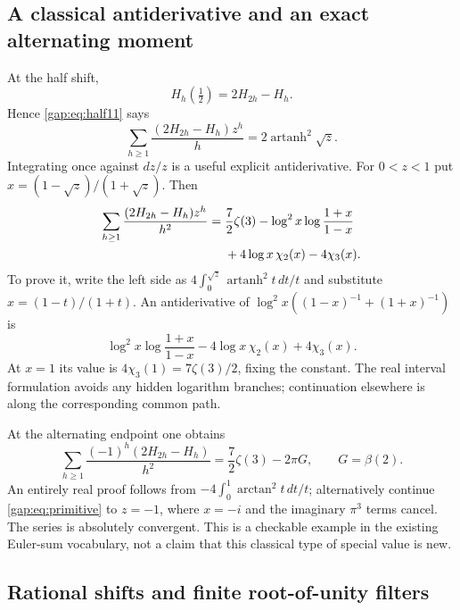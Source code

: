 \documentclass[11pt,letterpaper]{article}
\numberwithin{equation}{section}
\theoremstyle{plain}
\theoremstyle{definition}
\theoremstyle{remark}
\begin{document}
\subsection{A classical antiderivative and an exact alternating moment}

At the half shift,
\[
 H_h(\tfrac12)=2H_{2h}-H_h.
\]
Hence \eqref{gap:eq:half11} says
\begin{equation}\label{gap:eq:harmonic-half}
 \sum_{h\geq1}\frac{(2H_{2h}-H_h)z^h}{h}
     =2\operatorname{artanh}^2\sqrt z.
\end{equation}
Integrating once against $dz/z$ is a useful explicit antiderivative.
For $0<z<1$ put \mbox{$x=(1-\sqrt z)/(1+\sqrt z)$}. Then
\begin{align}
 \sum_{h\geq1}\frac{(2H_{2h}-H_h)z^h}{h^2}
 ={}&\frac72\zeta(3)
   -\log^2x\log\frac{1+x}{1-x}\notag\\
   &+4\log x\,\chi_2(x)-4\chi_3(x).
 \label{gap:eq:primitive}
\end{align}
To prove it, write the left side as
$4\int_0^{\sqrt z}\operatorname{artanh}^2t\,dt/t$ and substitute
$x=(1-t)/(1+t)$. An antiderivative of
$\log^2x((1-x)^{-1}+(1+x)^{-1})$ is
\[
 \log^2x\log\frac{1+x}{1-x}
 -4\log x\,\chi_2(x)+4\chi_3(x).
\]
At $x=1$ its value is $4\chi_3(1)=7\zeta(3)/2$, fixing the constant.
The real interval formulation avoids any hidden logarithm branches;
continuation elsewhere is along the corresponding common path.

At the alternating endpoint one obtains
\begin{equation}\label{gap:eq:alternating-primitive}
 \sum_{h\geq1}\frac{(-1)^h(2H_{2h}-H_h)}{h^2}
       =\frac72\zeta(3)-2\pi G,
 \qquad G=\beta(2).
\end{equation}
An entirely real proof follows from
$-4\int_0^1\arctan^2t\,dt/t$; alternatively continue
\eqref{gap:eq:primitive} to $z=-1$, where $x=-i$ and the imaginary
$\pi^3$ terms cancel. The series is absolutely convergent.
This is a checkable example in the existing Euler-sum vocabulary,
not a claim that this classical type of special value is new.

\subsection{Rational shifts and finite root-of-unity filters}
\end{document}

